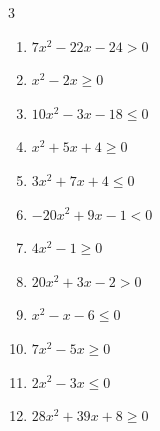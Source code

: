 \begin{multicols}{3}
\begin{enumerate}

  \item $7x^{2}-22x-24>0$


  \item $x^{2}-2x\geq 0$

        \phantom{$\displaystyle x \leqq 0 , \; 2 \leqq x$}

  \item $10x^{2}-3x-18\leq 0$


  \item $x^{2}+5x+4\geq 0$

        \phantom{$\displaystyle x \leqq -4 , \; -1 \leqq x$}

  \item $3x^{2}+7x+4\leq 0$


  \item $-20x^{2}+9x-1<0$


  \item $4x^{2}-1\geq 0$


\columnbreak %

  \item $20x^{2}+3x-2>0$


  \item $x^{2}-x-6\leq 0$

        \phantom{$\displaystyle -2 \leqq x \leqq 3$}

  \item $7x^{2}-5x\geq 0$


  \item $2x^{2}-3x\leq 0$


  \item $28x^{2}+39x+8\geq 0$


\end{enumerate}
\end{multicols}
